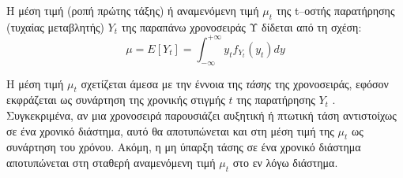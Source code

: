 Η μέση τιμή (ροπή πρώτης τάξης) ή  αναμενόμενη τιμή $\mu_t$ της t–οστής παρατήρησης (τυχαίας μεταβλητής) $Y_t$
της παραπάνω χρονοσειράς Υ δίδεται από τη σχέση:\\
$$\mu = E \left[  Y_t \right]= \int_{-\infty }^{+\infty } y_tf_{Y_t}\left(y_t\right) dy   $$



Η μέση τιμή $\mu_t$ σχετίζεται άμεσα
με την έννοια της \textit{τάσης} της χρονοσειράς, εφόσον εκφράζεται ως συνάρτηση της
χρονικής στιγμής $t$ της παρατήρησης $Y_t$ . Συγκεκριμένα, αν μια χρονοσειρά παρουσιάζει
αυξητική ή πτωτική τάση αντιστοίχως σε ένα χρονικό διάστημα, αυτό θα αποτυπώνεται
και στη μέση τιμή της $\mu_t$ ως συνάρτηση του χρόνου. Ακόμη, η μη ύπαρξη τάσης σε ένα
χρονικό διάστημα αποτυπώνεται στη σταθερή αναμενόμενη τιμή $\mu_t$ στο εν λόγω
διάστημα.
%
%
%



